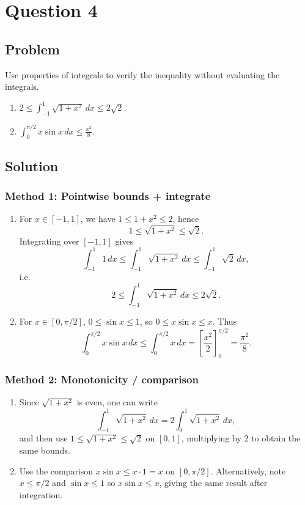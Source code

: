 \documentclass[12pt]{article}
\begin{document}
\newpage
\section*{Question 4}

\subsection*{Problem}

Use properties of integrals to verify the inequality without evaluating the integrals.
\begin{enumerate}[label=(\roman*)]
\item \(\displaystyle 2 \le \int_{-1}^{1}\sqrt{1+x^2}\,dx \le 2\sqrt{2}.\)
\item \(\displaystyle \int_{0}^{\pi/2} x\sin x\,dx \le \frac{\pi^2}{8}.\)
\end{enumerate}

\subsection*{Solution}

\subsubsection*{Method 1: Pointwise bounds + integrate}

\begin{enumerate}[label=(\roman*)]
\item For \(x\in[-1,1]\), we have \(1\le 1+x^2\le 2\), hence
\[
1 \le \sqrt{1+x^2} \le \sqrt{2}.
\]
Integrating over \([-1,1]\) gives
\[
\int_{-1}^1 1\,dx \le \int_{-1}^1 \sqrt{1+x^2}\,dx \le \int_{-1}^1 \sqrt{2}\,dx,
\]
i.e.
\[
2 \le \int_{-1}^1 \sqrt{1+x^2}\,dx \le 2\sqrt{2}.
\]

\item For \(x\in[0,\pi/2]\), \(0\le \sin x \le 1\), so \(0\le x\sin x \le x\). Thus
\[
\int_0^{\pi/2} x\sin x\,dx \le \int_0^{\pi/2} x\,dx = \left[\frac{x^2}{2}\right]_0^{\pi/2}=\frac{\pi^2}{8}.
\]
\end{enumerate}

\subsubsection*{Method 2: Monotonicity / comparison}

\begin{enumerate}[label=(\roman*)]
\item Since \(\sqrt{1+x^2}\) is even, one can write
\[
\int_{-1}^1 \sqrt{1+x^2}\,dx = 2\int_0^1 \sqrt{1+x^2}\,dx,
\]
and then use \(1\le \sqrt{1+x^2}\le \sqrt{2}\) on \([0,1]\), multiplying by 2 to obtain the same bounds.

\item Use the comparison \(x\sin x \le x\cdot 1=x\) on \([0,\pi/2]\). Alternatively, note \(x\le \pi/2\) and \(\sin x\le 1\) so \(x\sin x\le x\), giving the same result after integration.
\end{enumerate}
\end{document}
